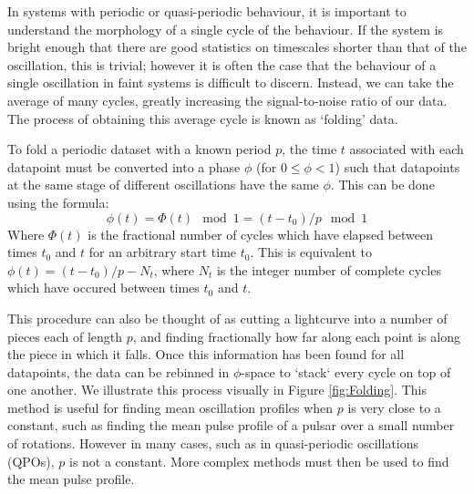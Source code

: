 \par In systems with periodic or quasi-periodic behaviour, it is important to understand the morphology of a single cycle of the behaviour.  If the system is bright enough that there are good statistics on timescales shorter than that of the oscillation, this is trivial; however it is often the case that the behaviour of a single oscillation in faint systems is difficult to discern.  Instead, we can take the average of many cycles, greatly increasing the signal-to-noise ratio of our data.  The process of obtaining this average cycle is known as `folding' data.
\par To fold a periodic dataset with a known period $p$, the time $t$ associated with each datapoint must be converted into a phase $\phi$ (for $0\leq\phi<1$) such that datapoints at the same stage of different oscillations have the same $\phi$.  This can be done using the formula:
\begin{equation}
\phi(t)=\Phi(t)\mod1=(t-t_0)/p\mod1
\label{eq:simfold}
\end{equation}
Where $\Phi(t)$ is the fractional number of cycles which have elapsed between times $t_0$ and $t$ for an arbitrary start time $t_0$.  This is equivalent to $\phi(t)=(t-t_0)/p-N_t$, where $N_t$ is the integer number of complete cycles which have occured between times $t_0$ and $t$.
\par This procedure can also be thought of as cutting a lightcurve into a number of pieces each of length $p$, and finding fractionally how far along each point is along the piece in which it falls.  Once this information has been found for all datapoints, the data can be rebinned in $\phi$-space to `stack` every cycle on top of one another.  We illustrate this process visually in Figure \ref{fig:Folding}.  This method is useful for finding mean oscillation profiles when $p$ is very close to a constant, such as finding the mean pulse profile of a pulsar over a small number of rotations.  However in many cases, such as in quasi-periodic oscillations (QPOs), $p$ is not a constant.  More complex methods must then be used to find the mean pulse profile.

